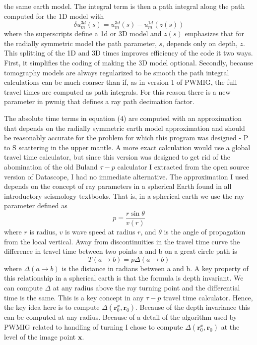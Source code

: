 \documentclass[12pt]{amsart}
\begin{document}
the same earth model.   The integral term is then a path integral along the path computed for the 1D model with
\begin{equation}
\delta u_m^{3d} (s) = u_m^{3d}(s) - u_m^{1d} ( z(s)) 
\end{equation}
where the superscripts define a 1d or 3D model and $z(s)$ emphasizes that for the radially symmetric model the path parameter, $s$, depends only on depth, $z$.   This splitting of the 1D and 3D times improves efficiency of the code it
two ways.  First, it simplifies the coding of making the 3D model optional.  Secondly, because tomography models are 
always regularized to be smooth the path integral calculations can be much coarser than if, as in version 1 of 
PWMIG, the full travel times are computed as path integrals.   For this reason there is a new parameter in pwmig that
defines a ray path decimation factor.  

The absolute time terms in equation (4) are computed with an approximation that depends on the radially symmetric earth model approximation and should be reasonably accurate for the problem for which this program was designed - P to S scattering in the upper mantle.   A more exact calculation would use a global travel time calculator, but since this version was designed to 
get rid of the abomination of the old Buland $\tau - p$  calculator I extracted from the open source version of Datascope, I had 
no immediate alternative.   The approximation I used depends on the concept of ray parameters in a spherical Earth 
found in all introductory seismology textbooks.   That is, in a spherical earth we use the ray parameter defined as
\begin{equation}
p = \frac{r \sin \theta }{v(r)}
\end{equation}
where $r$ is radius, $v$ is wave speed at radius $r$, and $\theta$ is the angle of propagation from the local vertical.  
Away from discontinuities in the travel time curve the difference in travel time between two points a and b on a great circle
path is
\begin{equation}
T(a \rightarrow b) = p \Delta (a \rightarrow b)
\end{equation}
where $\Delta (a \rightarrow b) $ is the distance in radians between a and b.   A key property of this relationship in 
a spherical earth is that the formula is depth invariant.   We can compute $\Delta$ at any radius above the ray 
turning point and the differential time is the same.   This is a key concept in any $\tau - p $ travel time calculator.   
Hence, the key idea here is to compute $\Delta ( \mathbf{r}_0 ^x, \mathbf{r}_0 )$.   Because of the depth invariance this 
can be computed at any radius.   Because of a detail of the algorithm used by PWMIG related to handling of turning I chose
to compute $\Delta ( \mathbf{r}_0 ^x, \mathbf{r}_0 )$ at the level of the image point $\mathbf{x}$.   
\end{document}
